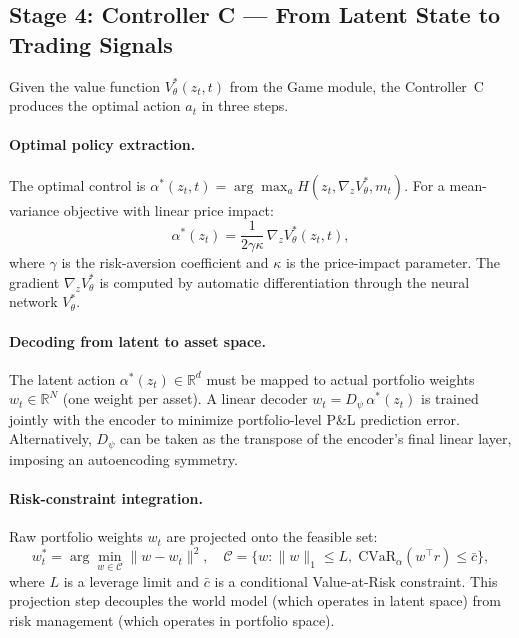 \documentclass[12pt,a4paper]{article}
\theoremstyle{plain}
\theoremstyle{definition}
\newcommand{\R}{\mathbb{R}}
\newcommand{\1}{\mathbbm{1}}
\begin{document}
\subsection{Stage 4: Controller C — From Latent State to Trading Signals}
\label{subsec:controller_impl}

Given the value function $V^*_\theta(z_t, t)$ from the Game module, the
Controller~C produces the optimal action $a_t$ in three steps.

\paragraph{Optimal policy extraction.}
The optimal control is $\alpha^*(z_t, t) = \arg\max_a H(z_t, \nabla_z V^*_\theta, m_t)$.
For a mean-variance objective with linear price impact:
\begin{equation}
\label{eq:optimal_policy}
\alpha^*(z_t) = \frac{1}{2\gamma\kappa}\,\nabla_z V^*_\theta(z_t, t),
\end{equation}
where $\gamma$ is the risk-aversion coefficient and $\kappa$ is the price-impact
parameter.  The gradient $\nabla_z V^*_\theta$ is computed by automatic
differentiation through the neural network $V^*_\theta$.

\paragraph{Decoding from latent to asset space.}
The latent action $\alpha^*(z_t) \in \R^d$ must be mapped to actual portfolio
weights $w_t \in \R^N$ (one weight per asset).  A linear decoder
$w_t = D_\psi\,\alpha^*(z_t)$ is trained jointly with the encoder to minimize
portfolio-level P\&L prediction error.  Alternatively, $D_\psi$ can be taken as
the transpose of the encoder's final linear layer, imposing an autoencoding
symmetry.

\paragraph{Risk-constraint integration.}
Raw portfolio weights $w_t$ are projected onto the feasible set:
\begin{equation}
\label{eq:risk_proj}
w^*_t = \arg\min_{w \in \mathcal{C}} \|w - w_t\|^2,
\quad
\mathcal{C} = \bigl\{w : \|w\|_1 \leq L,\; \mathrm{CVaR}_\alpha(w^\top r) \leq \bar c\bigr\},
\end{equation}
where $L$ is a leverage limit and $\bar c$ is a conditional Value-at-Risk
constraint.  This projection step decouples the world model (which operates in
latent space) from risk management (which operates in portfolio space).
\end{document}
